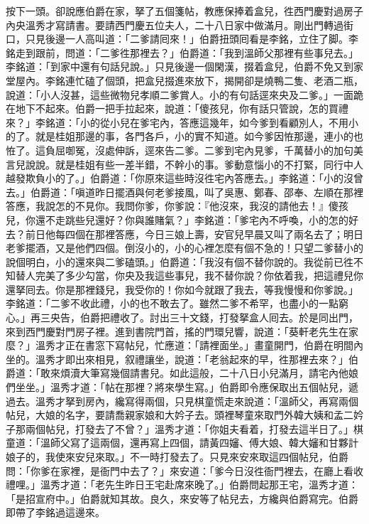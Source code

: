 按下一頭。卻說應伯爵在家，拏了五個箋帖，教應保捧着盒兒，徃西門慶對過房子內央溫秀才寫請書。要請西門慶五位夫人，二十八日家中做滿月。剛出門轉過街口，只見後邊一人高叫道：「二爹請囘來！」伯爵扭頭囘看是李銘，立住了脚。李銘走到跟前，問道：「二爹徃那裡去？」伯爵道：「我到溫師父那裡有些事兒去。」李銘道：「到家中還有句話兒說。」只見後邊一個閑漢，掇着盒兒，伯爵不免又到家堂屋內。李銘連忙磕了個頭，把盒兒掇進來放下，揭開卻是燒鴨二隻、老酒二瓶，說道：「小人沒甚，這些微物兒孝順二爹賞人。小的有句話逕來央及二爹。」一面跪在地下不起來。伯爵一把手拉起來，說道：「傻孩兒，你有話只管說，怎的買禮來？」李銘道：「小的從小兒在爹宅內，答應這幾年，如今爹到看顧別人，不用小的了。就是桂姐那邊的事，各門各戶，小的實不知道。如今爹因恠那邊，連小的也恠了。這負屈啣冤，沒處伸訴，逕來告二爹。二爹到宅內見爹，千萬替小的加句美言兒說說。就是桂姐有些一差半錯，不幹小的事。爹動意惱小的不打緊，同行中人越發欺負小的了。」伯爵道：「你原來這些時沒徃宅內答應去。」李銘道：「小的沒曾去。」伯爵道：「嗔道昨日擺酒與何老爹接風，叫了吳惠、鄭春、邵奉、左順在那裡答應，我說怎的不見你。我問你爹，你爹說：『他沒來，我沒的請他去！』傻孩兒，你還不走跳些兒還好？你與誰賭氣？」李銘道：「爹宅內不呼喚，小的怎的好去？前日他每四個在那裡答應，今日三娘上壽，安官兒早晨又叫了兩名去了；明日老爹擺酒，又是他們四個。倒沒小的，小的心裡怎麼有個不急的！只望二爹替小的說個明白，小的還來與二爹磕頭。」伯爵道：「我沒有個不替你說的。我從前已徃不知替人完美了多少勾當，你央及我這些事兒，我不替你說？你依着我，把這禮兒你還拏囘去。你是那裡錢兒，我受你的！你如今就跟了我去，等我慢慢和你爹說。」李銘道：「二爹不收此禮，小的也不敢去了。雖然二爹不希罕，也盡小的一點窮心。」再三央告，伯爵把禮收了。討出三十文錢，打發拏盒人囘去。於是同出門，來到西門慶對門房子裡。進到書院門首，搖的門環兒響，說道：「葵軒老先生在家麼？」溫秀才正在書窓下寫帖兒，忙應道：「請裡面坐。」畫童開門，伯爵在明間內坐的。溫秀才即出來相見，叙禮讓坐，說道：「老翁起來的早，徃那裡去來？」伯爵道：「敢來煩瀆大筆寫幾個請書兒。如此這般，二十八日小兒滿月，請宅內他娘們坐坐。」溫秀才道：「帖在那裡？將來學生寫。」伯爵即令應保取出五個帖兒，遞過去。溫秀才拏到房內，纔寫得兩個，只見棋童慌走來說道：「溫師父，再寫兩個帖兒，大娘的名字，要請喬親家娘和大妗子去。頭裡琴童來取門外韓大姨和孟二妗子那兩個帖兒，打發去了不曾？」溫秀才道：「你姐夫看着，打發去這半日了。」棋童道：「溫師父寫了這兩個，還再寫上四個，請黃四嬸、傅大娘、韓大嬸和甘夥計娘子的，我使來安兒來取。」不一時打發去了。只見來安來取這四個帖兒，伯爵問：「你爹在家裡，是衙門中去了？」來安道：「爹今日沒徃衙門裡去，在廳上看收禮哩。」溫秀才道：「老先生昨日王宅赴席來晚了。」伯爵問起那王宅，溫秀才道：「是招宣府中。」伯爵就知其故。良久，來安等了帖兒去，方纔與伯爵寫完。伯爵即帶了李銘過這邊來。

